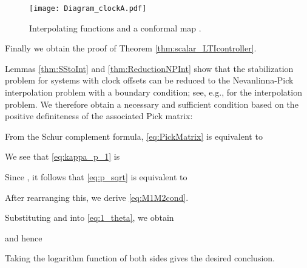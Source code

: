 \documentclass[letterpaper, 12pt, draftcls, onecolumn]{ieeeconf}
\begin{document}
\begin{figure}[tb]
	\centering
	\texttt{[image: Diagram\_clockA.pdf]}
	\caption{ Interpolating functions  and a conformal map .}
	\label{fig:diagram}
\end{figure}



Finally we obtain the proof of Theorem \ref{thm:scalar_LTIcontroller}.

\noindent{}
Lemmas \ref{thm:SStoInt} and \ref{thm:ReductionNPInt} show that
the stabilization problem for systems with clock offsets
can be reduced to 
the Nevanlinna-Pick interpolation problem 
with a boundary condition; see, e.g., 
\cite[Sec. 2.11]{foias1996} for the interpolation problem.
We therefore obtain a necessary and sufficient condition 
based on the positive definiteness of
the associated Pick matrix:

From the Schur complement formula, \eqref{eq:PickMatrix} is equivalent to

We see that \eqref{eq:kappa_p_1} is 

Since , 
it follows that \eqref{eq:p_sqrt} is equivalent to

After rearranging this, we derive \eqref{eq:M1M2cond}.
\hspace*{\fill} 

\noindent{}
Substituting  and
 into \eqref{eq:1_theta}, 
we obtain

and hence

Taking the logarithm function of both sides gives the desired conclusion.
\hspace*{\fill} 
\end{document}
